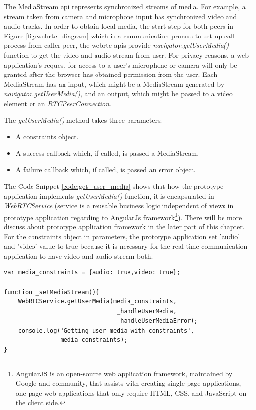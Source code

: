 \par The MediaStream \gls{api} represents synchronized streams of media. For example, a stream taken from camera and microphone input has synchronized video and audio tracks. In order to obtain local media, the start step for both peers in Figure \ref{fig:webrtc_diagram} which is a communication process to set up call process from caller peer, the \gls{webrtc} \gls{api}s provide \textit{navigator.getUserMedia()} function to get the video and audio stream from user. For privacy reasons, a web application’s request for access to a user’s microphone or camera will only be granted after the browser has obtained permission from the user. Each MediaStream has an input, which might be a MediaStream generated by \textit{navigator.getUserMedia()}, and an output, which might be passed to a video element or an \textit{RTCPeerConnection}.
\par The \textit{getUserMedia()} method takes three parameters:

\begin{itemize}[topsep=-1em,parsep=0em,itemsep=0em]
 \item A constraints object.
 \item A success callback which, if called, is passed a MediaStream.
 \item A failure callback which, if called, is passed an error object.
\end{itemize}

\par The Code Snippet \ref{code:get_user_media} shows that how the prototype application implements \textit{getUserMedia()} function, it is encapsulated in \textit{WebRTCService} (service is a reusable business logic independent of views in prototype application regarding to AngularJs framework\footnote{AngularJS is an open-source web application framework, maintained by Google and community, that assists with creating single-page applications, one-page web applications that only require HTML, CSS, and JavaScript on the client side.\cite{wiki:angularjs}}). There will be more discuss about prototype application framework in the later part of this chapter. For the constraints object in parameters, the prototype application set 'audio' and 'video' value to true because it is necessary for the real-time communication application to have video and audio stream both.

\begin{lstlisting}[caption={Get User Media Stream function},label={code:get_user_media}]
var media_constraints = {audio: true,video: true};

function _setMediaStream(){
	WebRTCService.getUserMedia(media_constraints,
  								_handleUserMedia,
  								_handleUserMediaError);
  	console.log('Getting user media with constraints', 
  				media_constraints);
}
\end{lstlisting}

